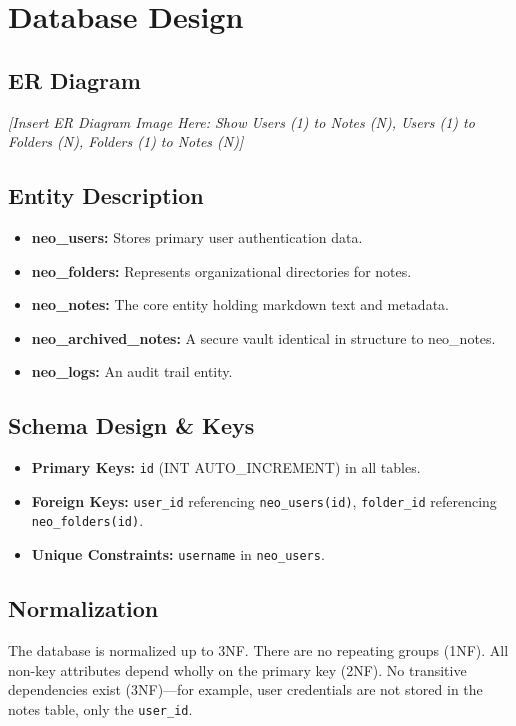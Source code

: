 \documentclass[12pt,a4paper]{report}
\begin{document}
\chapter{Database Design}
\section{ER Diagram}
\textit{[Insert ER Diagram Image Here: Show Users (1) to Notes (N), Users (1) to Folders (N), Folders (1) to Notes (N)]}

\section{Entity Description}
\begin{itemize}
    \item \textbf{neo\_users:} Stores primary user authentication data.
    \item \textbf{neo\_folders:} Represents organizational directories for notes.
    \item \textbf{neo\_notes:} The core entity holding markdown text and metadata.
    \item \textbf{neo\_archived\_notes:} A secure vault identical in structure to neo\_notes.
    \item \textbf{neo\_logs:} An audit trail entity.
\end{itemize}

\section{Schema Design \& Keys}
\begin{itemize}
    \item \textbf{Primary Keys:} \texttt{id} (INT AUTO\_INCREMENT) in all tables.
    \item \textbf{Foreign Keys:} \texttt{user\_id} referencing \texttt{neo\_users(id)}, \texttt{folder\_id} referencing \texttt{neo\_folders(id)}.
    \item \textbf{Unique Constraints:} \texttt{username} in \texttt{neo\_users}.
\end{itemize}

\section{Normalization}
The database is normalized up to 3NF. There are no repeating groups (1NF). All non-key attributes depend wholly on the primary key (2NF). No transitive dependencies exist (3NF)—for example, user credentials are not stored in the notes table, only the \texttt{user\_id}.
\end{document}
